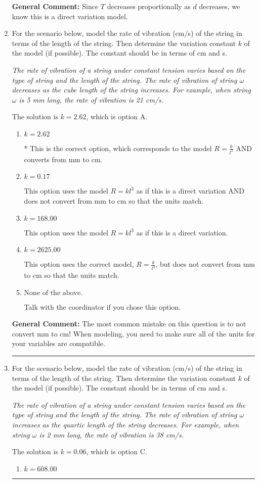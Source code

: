 \documentclass{extbook}[14pt]
\newcommand{\litem}[1]{\item #1

\rule{\textwidth}{0.4pt}}
\begin{document}
\begin{enumerate}
{\textbf{General Comment:} Since $T$ decreases proportionally as $d$ decreases, we know this is a direct variation model.
}
\litem{
For the scenario below, model the rate of vibration (cm/s) of the string in terms of the length of the string. Then determine the variation constant $k$ of the model (if possible). The constant should be in terms of cm and s.

\begin{center}
    \textit{ The rate of vibration of a string under constant tension varies based on the type of string and the length of the string. The rate of vibration of string $\omega$ decreases as the cube length of the string increases. For example, when string $\omega$ is 5 mm long, the rate of vibration is 21 cm/s. }
\end{center}
The solution is \( k = 2.62 \), which is option A.\begin{enumerate}[label=\Alph*.]
\item \( k = 2.62 \)

* This is the correct option, which corresponds to the model $R = \frac{k}{l^{3}}$ AND converts from mm to cm.
\item \( k = 0.17 \)

This option uses the model $R = kl^{3}$ as if this is a direct variation AND does not convert from mm to cm so that the units match.
\item \( k = 168.00 \)

This option uses the model $R = kl^{3}$ as if this is a direct variation.
\item \( k = 2625.00 \)

This option uses the correct model, $R = \frac{k}{l^{3}}$, but does not convert from mm to cm so that the units match.
\item \( \text{None of the above.} \)

Talk with the coordinator if you chose this option.
\end{enumerate}

\textbf{General Comment:} The most common mistake on this question is to not convert mm to cm! When modeling, you need to make sure all of the units for your variables are compatible.
}
\litem{
For the scenario below, model the rate of vibration (cm/s) of the string in terms of the length of the string. Then determine the variation constant $k$ of the model (if possible). The constant should be in terms of cm and s.

\begin{center}
    \textit{ The rate of vibration of a string under constant tension varies based on the type of string and the length of the string. The rate of vibration of string $\omega$ increases as the quartic length of the string decreases. For example, when string $\omega$ is 2 mm long, the rate of vibration is 38 cm/s. }
\end{center}
The solution is \( k = 0.06 \), which is option C.\begin{enumerate}[label=\Alph*.]
\item \( k = 608.00 \)


\end{enumerate}}
\end{enumerate}
\end{document}
